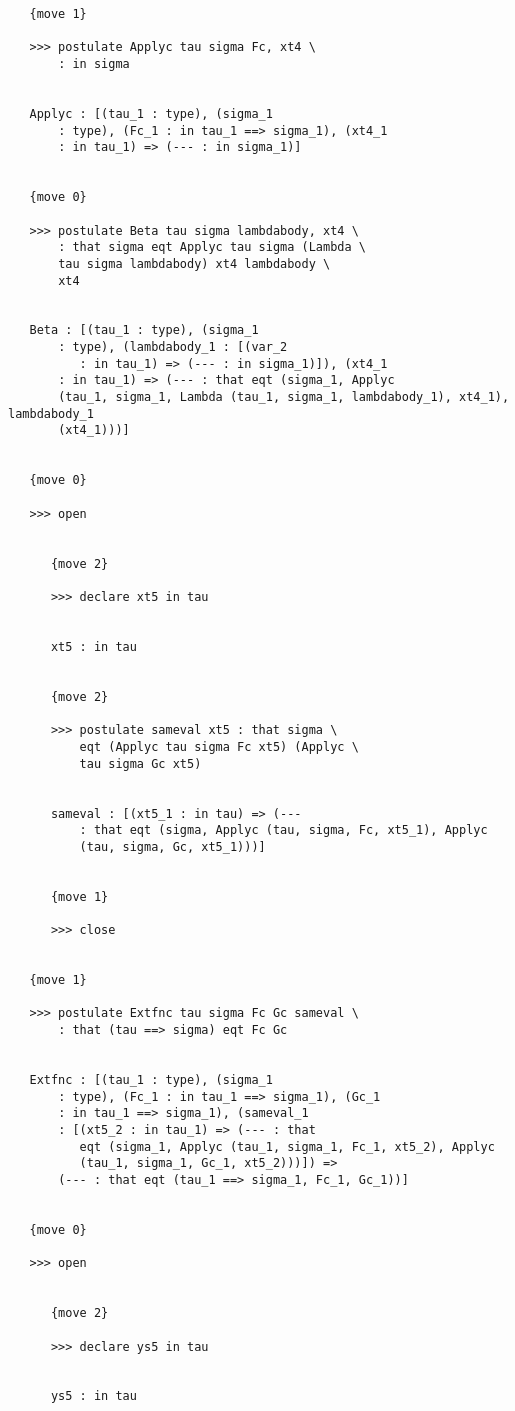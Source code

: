 \documentclass[12pt]{article}
\begin{document}
\begin{verbatim}
   {move 1}

   >>> postulate Applyc tau sigma Fc, xt4 \
       : in sigma


   Applyc : [(tau_1 : type), (sigma_1 
       : type), (Fc_1 : in tau_1 ==> sigma_1), (xt4_1 
       : in tau_1) => (--- : in sigma_1)]


   {move 0}

   >>> postulate Beta tau sigma lambdabody, xt4 \
       : that sigma eqt Applyc tau sigma (Lambda \
       tau sigma lambdabody) xt4 lambdabody \
       xt4


   Beta : [(tau_1 : type), (sigma_1 
       : type), (lambdabody_1 : [(var_2 
          : in tau_1) => (--- : in sigma_1)]), (xt4_1 
       : in tau_1) => (--- : that eqt (sigma_1, Applyc 
       (tau_1, sigma_1, Lambda (tau_1, sigma_1, lambdabody_1), xt4_1), lambdabody_1 
       (xt4_1)))]


   {move 0}

   >>> open


      {move 2}

      >>> declare xt5 in tau


      xt5 : in tau


      {move 2}

      >>> postulate sameval xt5 : that sigma \
          eqt (Applyc tau sigma Fc xt5) (Applyc \
          tau sigma Gc xt5)


      sameval : [(xt5_1 : in tau) => (--- 
          : that eqt (sigma, Applyc (tau, sigma, Fc, xt5_1), Applyc 
          (tau, sigma, Gc, xt5_1)))]


      {move 1}

      >>> close


   {move 1}

   >>> postulate Extfnc tau sigma Fc Gc sameval \
       : that (tau ==> sigma) eqt Fc Gc


   Extfnc : [(tau_1 : type), (sigma_1 
       : type), (Fc_1 : in tau_1 ==> sigma_1), (Gc_1 
       : in tau_1 ==> sigma_1), (sameval_1 
       : [(xt5_2 : in tau_1) => (--- : that 
          eqt (sigma_1, Applyc (tau_1, sigma_1, Fc_1, xt5_2), Applyc 
          (tau_1, sigma_1, Gc_1, xt5_2)))]) => 
       (--- : that eqt (tau_1 ==> sigma_1, Fc_1, Gc_1))]


   {move 0}

   >>> open


      {move 2}

      >>> declare ys5 in tau


      ys5 : in tau



\end{verbatim}
\end{document}

